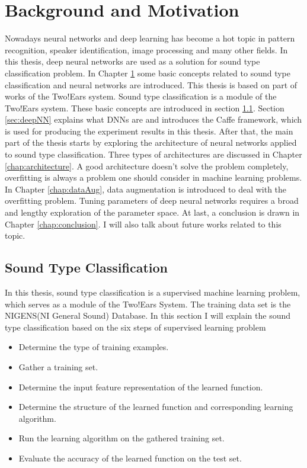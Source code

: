 \chapter{Background and Motivation}
\label{chap:backgrd}
Nowadays neural networks and deep learning has become a hot topic in pattern recognition, speaker identification, image processing and many other fields. In this thesis, deep neural networks are used as a solution for sound type classification problem.
In Chapter \ref{chap:backgrd} some basic concepts related to sound type classification and neural networks are introduced. This thesis is based on part of works of the Two!Ears system. Sound type classification is a module of the Two!Ears system. These basic concepts are introduced in section \ref{sec:soundtc}. Section \ref{sec:deepNN} explains what DNNs are and introduces the Caffe framework, which is used for producing the experiment results in this thesis. After that, the main part of the thesis starts by exploring the architecture of neural networks applied to sound type classification. Three types of architectures are discussed in Chapter \ref{chap:architecture}. A good architecture doesn't solve the problem completely, overfitting is always a problem one should consider in machine learning problems. In Chapter \ref{chap:dataAug}, data augmentation is introduced to deal with the overfitting problem. Tuning parameters of deep neural networks requires a broad and lengthy exploration of the parameter space.  At last, a conclusion is drawn in Chapter \ref{chap:conclusion}. I will also talk about future works related to this topic.

\section{Sound Type Classification}
\label{sec:soundtc}
In this thesis, sound type classification is a supervised machine learning problem, which serves as a module of the Two!Ears System. The training data set is the NIGENS(NI General Sound) Database. In this section I will explain the sound type classification based on the six steps of supervised learning problem\cite{mohri2012foundations}
\begin{itemize}
	\item Determine the type of training examples.
	\item Gather a training set.
	\item Determine the input feature representation of the learned function.
	\item Determine the structure of the learned function and corresponding learning algorithm.
	\item Run the learning algorithm on the gathered training set.
	\item Evaluate the accuracy of the learned function on the test set.
\end{itemize}

